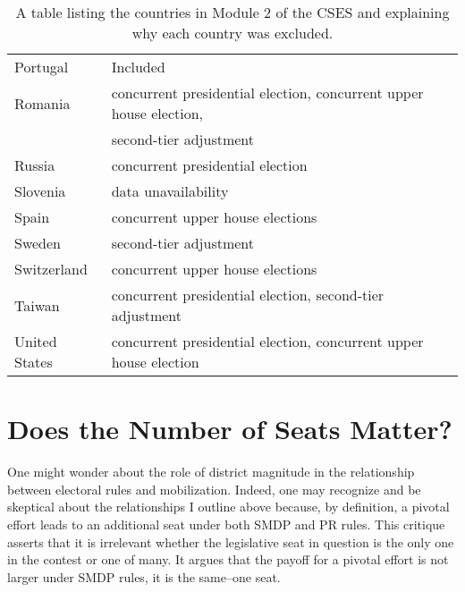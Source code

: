 \documentclass[12pt]{article}
\begin{document}
\begin{appendix}
\begin{table}
{\begin{tabular}{ll}
Portugal&Included\\
Romania&concurrent presidential election, concurrent upper house election, \\
&  second-tier adjustment\\
Russia&concurrent presidential election\\
Slovenia&data unavailability\\
Spain&concurrent upper house elections\\
Sweden&second-tier adjustment\\
Switzerland&concurrent upper house elections\\
Taiwan&concurrent presidential election, second-tier adjustment\\
United States&concurrent presidential election, concurrent upper house election
\end{tabular}\caption{A table listing the countries in Module 2 of the CSES and explaining why each country was excluded.}\label{exclusion}}
\end{table}

\section{Does the Number of Seats Matter?}

One might wonder about the role of district magnitude in the relationship between electoral rules and mobilization. Indeed, one may recognize and be skeptical about the relationships I outline above because, by definition, a pivotal effort leads to an additional seat under both SMDP and PR rules. This critique asserts that it is irrelevant whether the legislative seat in question is the only one in the contest or one of many. It argues that the payoff for a pivotal effort is not larger under SMDP rules, it is the same--one seat.


\end{appendix}
\end{document}
